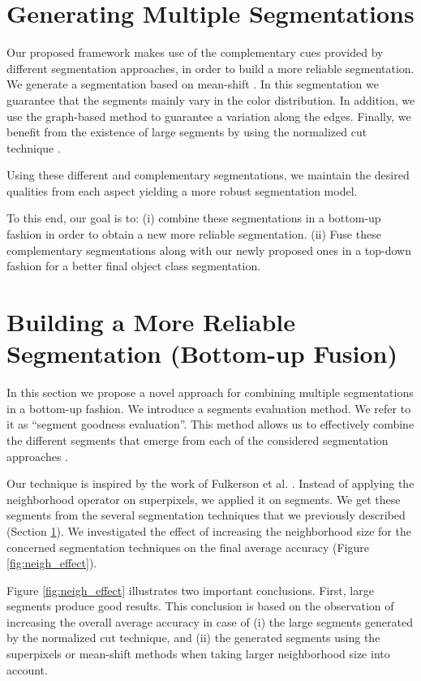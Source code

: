 \documentclass[10pt,twocolumn,letterpaper]{article}
\begin{document}
\section{Generating Multiple Segmentations}\label{GeneratMSeg}

Our proposed framework makes use of the complementary cues provided by different
segmentation approaches, in order to build a more reliable segmentation. We
generate a segmentation based on mean-shift \cite{Comaniciu02meanshift}.
In this segmentation we guarantee that the segments mainly vary in the color
distribution. In addition, we use the graph-based method 
\cite{Felzenszwalb04efficientgraph-based} to guarantee a variation along the edges.
Finally, we benefit from the existence of large segments by using the
normalized cut technique \cite{Shi_2000_3808}.

Using these different and complementary segmentations, we maintain the desired
qualities from each aspect yielding a more robust segmentation model.

To this end, our goal is to: (i) combine these segmentations in a bottom-up
fashion in order to obtain a new more reliable segmentation. (ii) Fuse 
these complementary segmentations along with our newly proposed ones in a
top-down fashion for a better final object class segmentation.

\section{Building a More Reliable Segmentation (Bottom-up Fusion)}\label{BuildSeg}

In this section we propose a novel approach for combining multiple segmentations in a bottom-up fashion.
We introduce a segments evaluation method. We refer to it as  ``segment goodness evaluation''.
This method allows us to effectively combine the different segments that emerge from each of the considered segmentation approaches .

Our technique is inspired by the work of Fulkerson et al. \cite{fulkerson09class}. 
Instead of applying the neighborhood operator on superpixels, we applied it on segments. 
We get these segments from the several segmentation techniques that we previously described (Section \ref{GeneratMSeg}).
We investigated the effect of increasing the neighborhood size for the concerned segmentation techniques on the final average accuracy (Figure \ref{fig:neigh_effect}).

Figure \ref{fig:neigh_effect} illustrates two important conclusions. First, large segments
produce good results. This conclusion is based on the observation of increasing the overall average accuracy in case of 
(i) the large segments generated by the normalized cut technique, and
(ii) the generated segments using the superpixels or mean-shift methods when taking larger neighborhood size into account.
\end{document}
